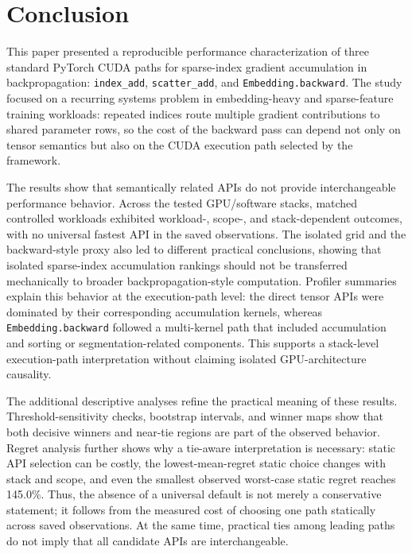 \section{Conclusion}
\label{sec:conclusion}

This paper presented a reproducible performance characterization of three standard PyTorch CUDA paths for sparse-index gradient accumulation in backpropagation: \texttt{index\_\allowbreak add}, \texttt{scatter\_\allowbreak add}, and \texttt{Embedding.\allowbreak backward}. The study focused on a recurring systems problem in embedding-heavy and sparse-feature training workloads: repeated indices route multiple gradient contributions to shared parameter rows, so the cost of the backward pass can depend not only on tensor semantics but also on the CUDA execution path selected by the framework.

The results show that semantically related APIs do not provide interchangeable performance behavior. Across the tested GPU/software stacks, matched controlled workloads exhibited workload-, scope-, and stack-dependent outcomes, with no universal fastest API in the saved observations. The isolated grid and the backward-style proxy also led to different practical conclusions, showing that isolated sparse-index accumulation rankings should not be transferred mechanically to broader backpropagation-style computation. Profiler summaries explain this behavior at the execution-path level: the direct tensor APIs were dominated by their corresponding accumulation kernels, whereas \texttt{Embedding.\allowbreak backward} followed a multi-kernel path that included accumulation and sorting or segmentation-related components. This supports a stack-level execution-path interpretation without claiming isolated GPU-architecture causality.

The additional descriptive analyses refine the practical meaning of these results. Threshold-sensitivity checks, bootstrap intervals, and winner maps show that both decisive winners and near-tie regions are part of the observed behavior. Regret analysis further shows why a tie-aware interpretation is necessary: static API selection can be costly, the lowest-mean-regret static choice changes with stack and scope, and even the smallest observed worst-case static regret reaches 145.0\%. Thus, the absence of a universal default is not merely a conservative statement; it follows from the measured cost of choosing one path statically across saved observations. At the same time, practical ties among leading paths do not imply that all candidate APIs are interchangeable.

